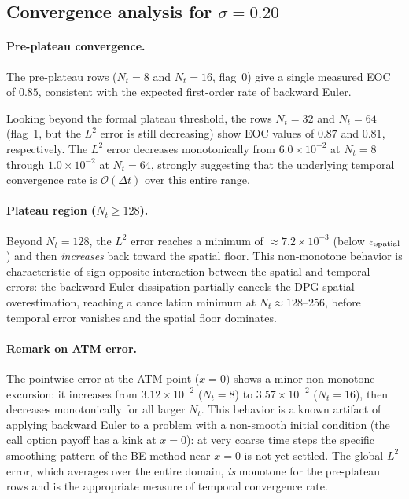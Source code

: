 \documentclass[11pt,a4paper]{article}
\newcommand{\Nt}{N_t}
\newcommand{\dt}{\Delta t}
\newcommand{\bigo}[1]{\mathcal{O}(#1)}
\newcommand{\eps}{\varepsilon}
\begin{document}
\subsection{Convergence analysis for \texorpdfstring{$\sigma=0.20$}{sigma=0.20}}

\paragraph{Pre-plateau convergence.}
The pre-plateau rows ($\Nt = 8$ and $\Nt = 16$, flag~0) give a
single measured EOC of $\mathbf{0.85}$, consistent with the
expected first-order rate of backward Euler.

Looking beyond the formal plateau threshold, the rows $\Nt = 32$
and $\Nt = 64$ (flag~1, but the $L^2$ error is still decreasing)
show EOC values of $0.87$ and $0.81$, respectively.  The $L^2$
error decreases monotonically from $6.0\times10^{-2}$ at
$\Nt=8$ through $1.0\times10^{-2}$ at $\Nt=64$, strongly
suggesting that the underlying temporal convergence rate is
$\bigo{\dt}$ over this entire range.

\paragraph{Plateau region ($\Nt \ge 128$).}
Beyond $\Nt=128$, the $L^2$ error reaches a minimum of
$\approx 7.2\times10^{-3}$ (below $\eps_{\rm spatial}$) and
then \emph{increases} back toward the spatial floor.  This
non-monotone behavior is characteristic of sign-opposite
interaction between the spatial and temporal errors: the
backward Euler dissipation partially cancels the DPG
spatial overestimation, reaching a cancellation minimum
at $\Nt \approx 128$--$256$, before temporal error vanishes
and the spatial floor dominates.

\paragraph{Remark on ATM error.}
The pointwise error at the ATM point ($x=0$) shows a minor
non-monotone excursion: it increases from $3.12\times10^{-2}$
($\Nt=8$) to $3.57\times10^{-2}$ ($\Nt=16$), then decreases
monotonically for all larger $\Nt$.  This behavior is a
known artifact of applying backward Euler to a problem with a
non-smooth initial condition (the call option payoff has a
kink at $x=0$): at very coarse time steps the specific
smoothing pattern of the BE method near $x=0$ is not
yet settled.  The global $L^2$ error, which averages over
the entire domain, \emph{is} monotone for the pre-plateau rows
and is the appropriate measure of temporal convergence rate.
\end{document}
